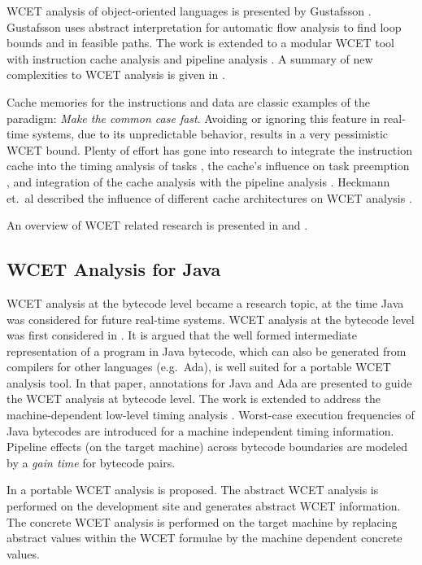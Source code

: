 WCET analysis of object-oriented languages is presented by Gustafsson
\cite{gustafsson:phd}. Gustafsson uses abstract interpretation for
automatic flow analysis to find loop bounds and in feasible paths.
The work is extended to a modular WCET tool with instruction cache
analysis and pipeline analysis \cite{eng:jnl:2003}.
A summary of new complexities to WCET analysis is given in
\cite{gustafsson:words:2002}.


Cache memories for the instructions and data are classic examples of
the paradigm: \emph{Make the common case fast}. Avoiding or ignoring
this feature in real-time systems, due to its unpredictable behavior,
results in a very pessimistic WCET bound. Plenty of effort has gone
into research to integrate the instruction cache into the timing
analysis of tasks \cite{Arnold1994,Healy1995}, the cache's influence
on task preemption \cite{279589,Mataix:1996}, and integration of the
cache analysis with the pipeline analysis \cite{wcet:healy:1999}.
Heckmann et.\ al described the influence of different cache
architectures on WCET analysis \cite{Heckmann:IEEE2003}.

An overview of WCET related research is presented in
\cite{R:Puschner:2000} and \cite{tecs:wcet:overview}.



\subsection{WCET Analysis for Java}

WCET analysis at the bytecode level became a research topic, at the
time Java was considered for future real-time systems. WCET analysis
at the bytecode level was first considered in \cite{R:Bernat:2000a}.
It is argued that the well formed intermediate representation of a
program in Java bytecode, which can also be generated from compilers
for other languages (e.g.\ Ada), is well suited for a portable WCET
analysis tool. In that paper, annotations for Java and Ada are
presented to guide the WCET analysis at bytecode level. The work is
extended to address the machine-dependent low-level timing analysis
\cite{R:Bate:2000a}. Worst-case execution frequencies of Java
bytecodes are introduced for a machine independent timing
information. Pipeline effects (on the target machine) across bytecode
boundaries are modeled by a \emph{gain time} for bytecode pairs.

In \cite{871917} a portable WCET analysis is proposed. The abstract
WCET analysis is performed on the development site and generates
abstract WCET information.
%
%
The concrete WCET analysis is performed on the target machine by
replacing abstract values within the WCET formulae by the machine
dependent concrete values.

